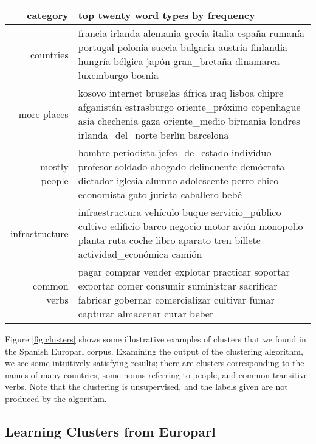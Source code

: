 \begin{figure*}[t!]
  \begin{tabular}{|r|p{10cm}|}
    \hline
    category  & top twenty word types by frequency \\
    \hline
    countries & francia irlanda alemania grecia italia españa rumanía portugal polonia suecia bulgaria austria finlandia hungría bélgica japón gran\_bretaña dinamarca luxemburgo bosnia \\
    \hline
    more places & kosovo internet bruselas áfrica iraq lisboa chipre afganistán estrasburgo oriente\_próximo copenhague asia chechenia gaza oriente\_medio birmania londres irlanda\_del\_norte berlín barcelona \\
    \hline
    mostly people & hombre periodista jefes\_de\_estado individuo profesor soldado abogado delincuente demócrata dictador iglesia alumno adolescente perro chico economista gato jurista caballero bebé \\
    \hline
    infrastructure & infraestructura vehículo buque servicio\_público cultivo edificio barco negocio motor avión monopolio planta ruta coche libro aparato tren billete actividad\_económica camión \\
    \hline
    common verbs & pagar comprar vender explotar practicar soportar exportar comer consumir suministrar sacrificar fabricar gobernar comercializar cultivar fumar capturar almacenar curar beber \\
    \hline
  \end{tabular}
\caption{Some illustrative clusters found by the Brown clustering algorithm on
the Spanish Europarl data. These are five out of $C=1000$ clusters, and
were picked and labeled by hand. The words listed are the
top twenty terms from that cluster, by frequency.}
\label{fig:clusters}
\end{figure*}

Figure \ref{fig:clusters} shows some illustrative examples of clusters that
we found in the Spanish Europarl corpus.  Examining the output of the
clustering algorithm, we see some intuitively satisfying results; there are
clusters corresponding to the names of many countries, some nouns referring to
people, and common transitive verbs. Note that the clustering is unsupervised,
and the labels given are not produced by the algorithm.

\subsection{Learning Clusters from Europarl}

